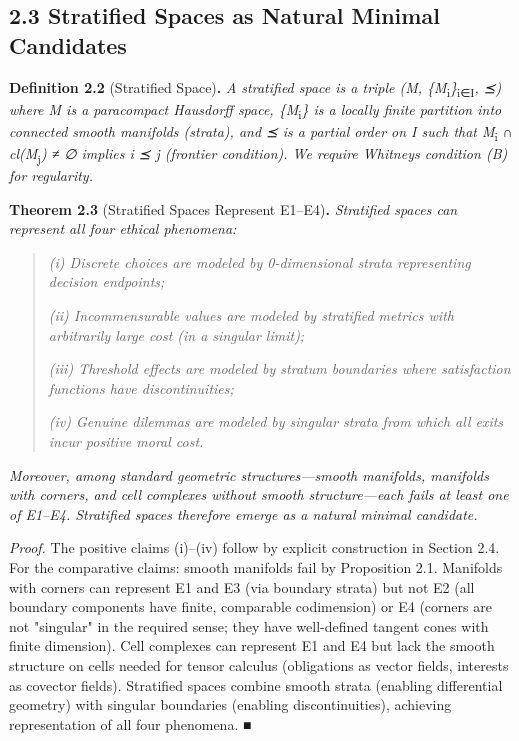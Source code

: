 \documentclass[12pt]{article}
\theoremstyle{plain}
\theoremstyle{definition}
\theoremstyle{remark}
\begin{document}
\subsection{2.3 Stratified Spaces as Natural Minimal
Candidates}\label{stratified-spaces-as-natural-minimal-candidates}

\textbf{Definition 2.2} (Stratified Space)\textbf{.} \emph{A stratified
space is a triple (M,
\{M}\textsubscript{i}\emph{\}}\textsubscript{i∈I}\emph{, ⪯) where M is a
paracompact Hausdorff space, \{M}\textsubscript{i}\emph{\} is a locally
finite partition into connected smooth manifolds (strata), and ⪯ is a
partial order on I such that M}\textsubscript{i} \emph{∩
cl(M}\textsubscript{j}\emph{) ≠ ∅ implies i ⪯ j (frontier condition). We
require Whitney\textquotesingle s condition (B) for regularity.}

\textbf{Theorem 2.3} (Stratified Spaces Represent E1--E4)\textbf{.}
\emph{Stratified spaces can represent all four ethical phenomena:}

\begin{quote}
\emph{(i) Discrete choices are modeled by 0-dimensional strata
representing decision endpoints;}

\emph{(ii) Incommensurable values are modeled by stratified metrics with
arbitrarily large cost (in a singular limit);}

\emph{(iii) Threshold effects are modeled by stratum boundaries where
satisfaction functions have discontinuities;}

\emph{(iv) Genuine dilemmas are modeled by singular strata from which
all exits incur positive moral cost.}
\end{quote}

\emph{Moreover, among standard geometric structures---smooth manifolds,
manifolds with corners, and cell complexes without smooth
structure---each fails at least one of E1--E4. Stratified spaces
therefore emerge as a natural minimal candidate.}

\emph{Proof.} The positive claims (i)--(iv) follow by explicit
construction in Section 2.4. For the comparative claims: smooth
manifolds fail by Proposition 2.1. Manifolds with corners can represent
E1 and E3 (via boundary strata) but not E2 (all boundary components have
finite, comparable codimension) or E4 (corners are not "singular" in the
required sense; they have well-defined tangent cones with finite
dimension). Cell complexes can represent E1 and E4 but lack the smooth
structure on cells needed for tensor calculus (obligations as vector
fields, interests as covector fields). Stratified spaces combine smooth
strata (enabling differential geometry) with singular boundaries
(enabling discontinuities), achieving representation of all four
phenomena. ■
\end{document}
